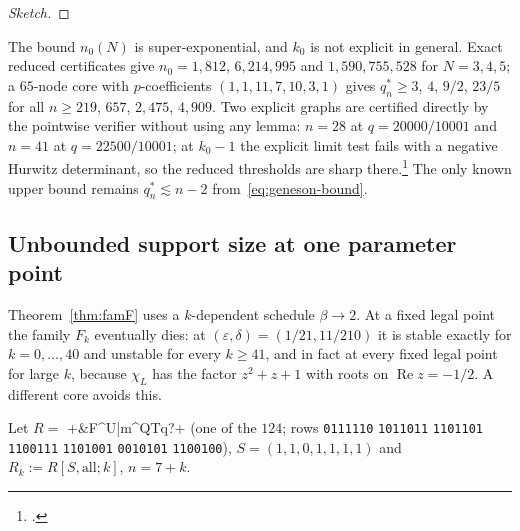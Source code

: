 \documentclass[11pt]{article}
\theoremstyle{definition}
\newcommand{\eps}{\varepsilon}
\newcommand{\Rea}{\operatorname{Re}}
\begin{document}
{\begin{proof}[Sketch]
\end{proof}
The bound $n_0(N)$ is super-exponential, and $k_0$ is not explicit in general. Exact reduced certificates give $n_0=1{,}812$,
$6{,}214{,}995$ and $1{,}590{,}755{,}528$ for $N=3,4,5$; a $65$-node core with $p$-coefficients $(1,1,11,7,10,3,1)$ gives
$q_n^*\ge3$, $4$, $9/2$, $23/5$ for all $n\ge219$, $657$, $2{,}475$, $4{,}909$. Two explicit graphs are certified directly by the
pointwise verifier without using any lemma: $n=28$ at $q=20000/10001$ and $n=41$ at $q=22500/10001$; at $k_0-1$ the explicit limit
test fails with a negative Hurwitz determinant, so the reduced thresholds are sharp there.\footnote{.}
The only known upper bound remains $q_n^*\lesssim n-2$ from~\eqref{eq:geneson-bound}.

\subsection{Unbounded support size at one parameter point}
Theorem~\ref{thm:famF} uses a $k$-dependent schedule $\beta\to2$. At a fixed legal point the family $F_k$ eventually dies: at
$(\eps,\delta)=(1/21,11/210)$ it is stable exactly for $k=0,\dots,40$ and unstable for every $k\ge41$, and in fact at every fixed
legal point for large $k$, because $\chi_L$ has the factor $z^2+z+1$ with roots on $\Rea z=-1/2$. A different core avoids this.

Let $R=$ \dsix+&F^U|m^QTq?+ (one of the $124$; rows \texttt{0111110} \texttt{1011011} \texttt{1101101} \texttt{1100111} \texttt{1101001}
\texttt{0010101} \texttt{1100100}),
$S=(1,1,0,1,1,1,1)$ and $R_k:=R[S,\text{all};k]$, $n=7+k$.

}
\end{document}
